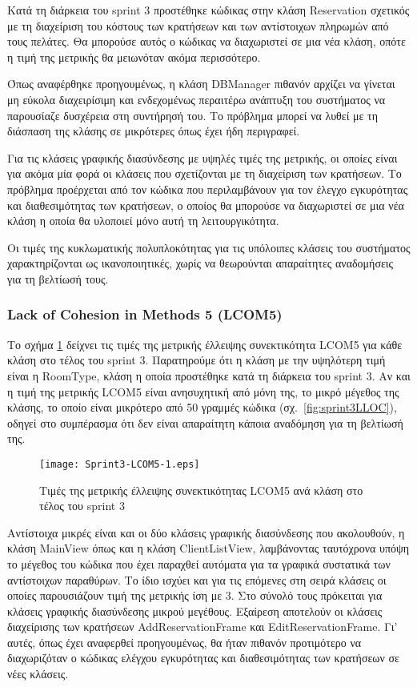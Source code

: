 Κατά τη διάρκεια του sprint 3 προστέθηκε κώδικας στην κλάση Reservation
σχετικός με τη διαχείριση του κόστους των κρατήσεων και των αντίστοιχων
πληρωμών από τους πελάτες. Θα μπορούσε αυτός ο κώδικας να διαχωριστεί σε
μια νέα κλάση, οπότε η τιμή της μετρικής θα μειωνόταν ακόμα περισσότερο.

Όπως αναφέρθηκε προηγουμένως, η κλάση DBManager πιθανόν αρχίζει να
γίνεται μη εύκολα διαχειρίσιμη και ενδεχομένως περαιτέρω ανάπτυξη του
συστήματος να παρουσίαζε δυσχέρεια στη συντήρησή του. Το πρόβλημα μπορεί
να λυθεί με τη διάσπαση της κλάσης σε μικρότερες όπως έχει ήδη
περιγραφεί.

Για τις κλάσεις γραφικής διασύνδεσης με υψηλές τιμές της μετρικής, οι
οποίες είναι για ακόμα μία φορά οι κλάσεις που σχετίζονται με τη
διαχείριση των κρατήσεων. Το πρόβλημα προέρχεται από τον κώδικα που
περιλαμβάνουν για τον έλεγχο εγκυρότητας και διαθεσιμότητας των
κρατήσεων, ο οποίος θα μπορούσε να διαχωριστεί σε μια νέα κλάση η οποία
θα υλοποιεί μόνο αυτή τη λειτουργικότητα.

Οι τιμές της κυκλωματικής πολυπλοκότητας για τις υπόλοιπες κλάσεις του
συστήματος χαρακτηρίζονται ως ικανοποιητικές, χωρίς να θεωρούνται
απαραίτητες αναδομήσεις για τη βελτίωσή τους.

\subsubsection{Lack of Cohesion in Methods 5 (LCOM5)}
\label{section:sprint3LCOM5}

Το σχήμα \ref{fig:sprint3LCOM5} δείχνει τις τιμές της μετρικής έλλειψης
συνεκτικότητα LCOM5 για κάθε κλάση στο τέλος του sprint 3. Παρατηρούμε
ότι η κλάση με την υψηλότερη τιμή είναι η RoomType, κλάση η οποία
προστέθηκε κατά τη διάρκεια του sprint 3. Αν και η τιμή της μετρικής
LCOM5 είναι ανησυχητική από μόνη της, το μικρό μέγεθος της κλάσης, το
οποίο είναι μικρότερο από 50 γραμμές κώδικα (σχ.\ \ref{fig:sprint3LLOC}),
οδηγεί στο συμπέρασμα ότι δεν είναι απαραίτητη
κάποια αναδόμηση για τη βελτίωσή της.

\begin{figure}
\centering
\texttt{[image: Sprint3-LCOM5-1.eps]}
\caption{Τιμές της μετρικής έλλειψης συνεκτικότητας LCOM5 ανά κλάση στο τέλος του sprint 3}
\label{fig:sprint3LCOM5}
\end{figure}

Αντίστοιχα μικρές είναι και οι δύο κλάσεις γραφικής διασύνδεσης που
ακολουθούν, η κλάση MainView όπως και η κλάση ClientListView,
λαμβάνοντας ταυτόχρονα υπόψη το μέγεθος του κώδικα που έχει παραχθεί
αυτόματα για τα γραφικά συστατικά των αντίστοιχων παραθύρων. Το ίδιο
ισχύει και για τις επόμενες στη σειρά κλάσεις οι οποίες παρουσιάζουν
τιμή της μετρικής ίση με 3. Στο σύνολό τους πρόκειται για κλάσεις
γραφικής διασύνδεσης μικρού μεγέθους. Εξαίρεση αποτελούν οι κλάσεις
διαχείρισης των κρατήσεων AddReservationFrame και EditReservationFrame.
Γι' αυτές, όπως έχει αναφερθεί προηγουμένως, θα ήταν πιθανόν προτιμότερο
να διαχωριζόταν ο κώδικας ελέγχου εγκυρότητας και διαθεσιμότητας των
κρατήσεων σε νέες κλάσεις.

